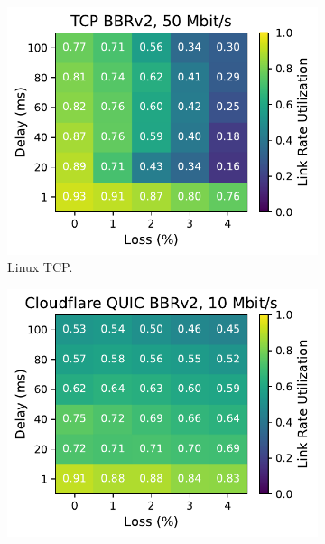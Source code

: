 \begin{figure}[ht]
\begin{subfigure}[b]{0.22\linewidth}
        \includegraphics[width=\linewidth,trim={0 0 2cm 0},clip]{splitting/figures/heatmaps/heatmap_tcp_bbr2_50mbps.pdf}
        \caption{Linux TCP.}
    \end{subfigure}
    \begin{subfigure}[b]{0.22\linewidth}
        \includegraphics[width=\linewidth,trim={0 0 2cm 0},clip]{splitting/figures/heatmaps/heatmap_quiche_bbr2_10mbps.pdf}

\end{subfigure}
\end{figure}
